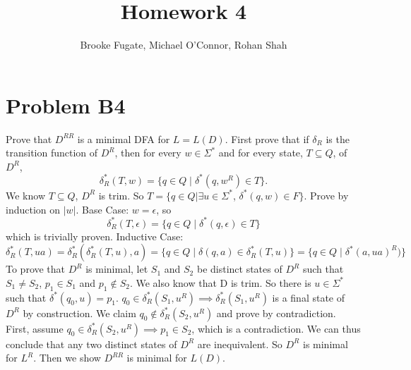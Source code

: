 \documentclass[12pt]{article}
\begin{document}
\pagestyle{plain}
\titleformat{\subsection}[runin]
  {\normalfont\large\bfseries}{\thesubsection}{1em}{}

\title{Homework 4}
\author{Brooke Fugate, Michael O'Connor, Rohan Shah}
\date{}

\maketitle

\section*{Problem B4}
Prove that $D^{RR}$ is a minimal DFA for $L=L(D)$. \newline
First prove that if $\delta_R$ is the transition function
of $D^R$, then for every $w\in \Sigma^*$ and for every
state, $T\subseteq Q$, of $D^R$,
\[
\delta_R^*(T, w) =  \{q\in Q \mid \delta^*(q, w^R) \in T\}.
\]
We know $T \subseteq Q$, $D^R$ is trim. So $T=\{q \in Q | \exists u \in \Sigma^*$, $\delta^* (q,w) \in F\}$. Prove by induction on $|w|$. \newline
Base Case: $w= \epsilon$, so \[
\delta_R^*(T, \epsilon) =  \{q\in Q \mid \delta^*(q, \epsilon) \in T\}
\] 
which is trivially proven. \newline
Inductive Case: \[
\delta_R^*(T, ua) =  \delta_R^*( \delta_R^*(T,u),a) = \{q\in Q \mid \delta(q, a) \in \delta_R^*(T, u)\} = \{q\in Q \mid \delta^*(a, ua)^R)\} 
\] 
To prove that $D^R$ is minimal, let $S_1$ and $S_2$ be distinct states of $D^R$ such that $S_1 \neq S_2$, $p_1 \in S_1$ and $p_1 \not \in S_2$. We also know that D is trim. So there is $u \in \Sigma^*$ such that $\delta^*(q_0,u) = p_1$. \newline
$q_0 \in \delta^*_R(S_1,u^R) \implies \delta^*_R(S_1,u^R)$ is a final state of $D^R$ by construction. We claim $q_0 \not \in \delta^*_R(S_2,u^R)$ and prove by contradiction. First, assume $q_0 \in \delta^*_R(S_2,u^R) \implies p_1 \in S_2$, which is a contradiction. We can thus conclude that any two distinct states of $D^R$ are inequivalent. So $D^R$ is minimal for $L^R$. Then we show $D^{RR}$ is minimal for $L(D)$.
\begin{comment}
I think this is not finished. Need to prove last part.
\end{comment}
\end{document}
